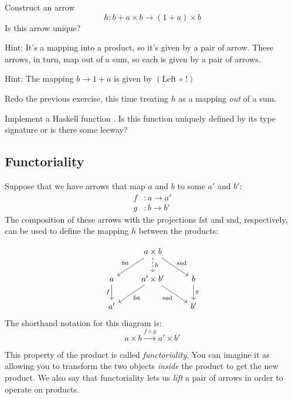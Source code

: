 \documentclass[DaoFP]{subfiles}
\begin{document}
\begin{exercise}
Construct an arrow 
\[ h \colon b + a \times b \to (1 + a) \times b \]
Is this arrow unique?

Hint: It's a mapping into a product, so it's given by a pair of arrow. These arrows, in turn, map out of a sum, so each is given by a pair of arrows. 

Hint: The mapping $b \to 1 + a$ is given by $(\text{Left} \, \circ \, !)$
\end{exercise}

\begin{exercise}
Redo the previous exercise, this time treating $h$ as a mapping \emph{out} of a sum. 
\end{exercise}

\begin{exercise}
Implement a Haskell function . Is this function uniquely defined by its type signature or is there some leeway?
\end{exercise}

\subsection{Functoriality}

Suppose that we have arrows that map $a$ and $b$ to some $a'$ and $b'$:
\begin{align*}
f &\colon a \to a' \\
g &\colon b \to b'
\end{align*}
The composition of these arrows with the projections $\text{fst}$ and $\text{snd}$, respectively, can be used to define the mapping $h$ between the products:

\[
 \begin{tikzcd}
 & a \times b
\arrow[d, dashed, "h"]
 \arrow[dl,  "\text{fst}"']
 \arrow[dr,   "\text{snd}"]
\\
a
\arrow[d, "f"']
&a' \times b'
 \arrow[dl,  "\text{fst}"]
  \arrow[dr,   "\text{snd}"']
& b
\arrow[d, "g"]
\\
a' && b'
 \end{tikzcd}
\]
The shorthand notation for this diagram is:
\[ a \times b \xrightarrow{f \times g} a' \times b' \]

This property of the product is called \emph{functoriality}. You can imagine it as allowing you to transform the two objects \emph{inside} the product to get the new product. We also say that functoriality lets us \emph{lift} a pair of arrows in order to operate on products.
\end{document}
